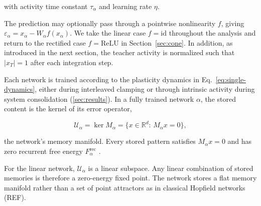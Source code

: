 \documentclass[10pt,letterpaper]{article}
\theoremstyle{plain}
\theoremstyle{remark}
\begin{document}
with activity time constant $\tau_\alpha$ and learning rate $\eta$.

The prediction may optionally pass through a pointwise nonlinearity $f$, giving $\varepsilon_\alpha=x_\alpha-W_\alpha f(x_\alpha)$. We take the linear case $f=\mathrm{id}$ throughout the analysis and return to the rectified case $f=\mathrm{ReLU}$ in Section~\ref{sec:cone}.
In addition, as introduced in the next section, the teacher activity is normalized such that $|x_T|=1$ after each integration step.


Each network is trained according to the plasticity dynamics in Eq.~\eqref{eq:single-dynamics}, either during interleaved clamping or through intrinsic activity during system consolidation (\ref{sec:results}).
In a fully trained network $\alpha$, the stored content is the kernel of its error operator,

\begin{equation}
\mathcal U_\alpha=\ker M_\alpha=\{x\in\mathbb R^d:\,M_\alpha x=0\},
\label{eq:manifold-kernel}
\end{equation}

the network's memory manifold. Every stored pattern satisfies $M_\alpha x=0$ and has zero recurrent free energy $F_\alpha^{\mathrm{rec}}$ \cite{tang2023covpcn}.

For the linear network, $\mathcal U_\alpha$ is a linear subspace. Any linear combination of stored memories is therefore a zero-energy fixed point. The network stores a flat memory manifold rather than a set of point attractors as in classical Hopfield networks (REF).
\end{document}
